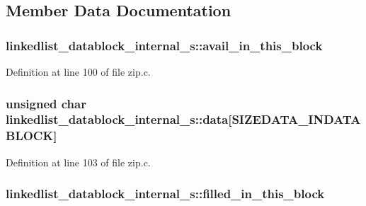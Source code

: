\subsection{Member Data Documentation}
\hypertarget{structlinkedlist__datablock__internal__s_a1d63f75d88f05ee665221ccf618a57ed}{
\subsubsection[{avail\-\_\-in\-\_\-this\-\_\-block}]{ linkedlist\-\_\-datablock\-\_\-internal\-\_\-s\-::avail\-\_\-in\-\_\-this\-\_\-block}}\label{structlinkedlist__datablock__internal__s_a1d63f75d88f05ee665221ccf618a57ed}


Definition at line 100 of file zip.\-c.

\hypertarget{structlinkedlist__datablock__internal__s_a04900ee41fa2247a73b7570ec162bb1d}{
\subsubsection[{data}]{\setlength{\rightskip}{0pt plus 5cm}unsigned char linkedlist\-\_\-datablock\-\_\-internal\-\_\-s\-::data\mbox{[}S\-I\-Z\-E\-D\-A\-T\-A\-\_\-\-I\-N\-D\-A\-T\-A\-B\-L\-O\-C\-K\mbox{]}}}\label{structlinkedlist__datablock__internal__s_a04900ee41fa2247a73b7570ec162bb1d}


Definition at line 103 of file zip.\-c.

\hypertarget{structlinkedlist__datablock__internal__s_a76ae854b6029e6617c7544d2eb311f77}{
\subsubsection[{filled\-\_\-in\-\_\-this\-\_\-block}]{ linkedlist\-\_\-datablock\-\_\-internal\-\_\-s\-::filled\-\_\-in\-\_\-this\-\_\-block}}\label{structlinkedlist__datablock__internal__s_a76ae854b6029e6617c7544d2eb311f77}


